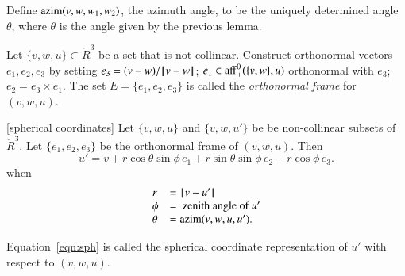 \begin{definition}[azim] 
Define ${\operatorname{azim}}(v,w,w_1,w_2)$, the azimuth angle, 
to be the uniquely determined
angle $\theta$, where $\theta$ is the angle given by the previous
lemma.
\end{definition}

\begin{definition}[frame]
Let $\{v,w,u\}\subset\ring{R}^3$ be a set that is not collinear.
Construct orthonormal vectors  $e_1,e_2,e_3$ by setting
$e_3 = (v-w)/{\hskip0.1em|\hskip-0.15em|\hskip0.1em}v - w{\hskip0.1em|\hskip-0.15em|\hskip0.1em}$; 
$e_1\in{\operatorname{aff}}_+^0(\{v,w\},u)$ orthonormal with $e_3$;
$e_2 = e_3\times e_1$.
 The set $E=\{e_1,e_2,e_3\}$ is called
the {\it orthonormal frame} for $(v,w,u)$.
\end{definition}

\begin{lemma}[spherical coordinates]\label{lemma:sph}
Let $\{v,w,u\}$ and $\{v,w,u'\}$ be be non-collinear subsets of $\ring{R}^3$.
Let $\{e_1,e_2,e_3\}$ be the orthonormal frame of $(v,w,u)$.
  Then
   \begin{equation}
   u' = v + r \cos\theta \sin\phi\, e_1 + r \sin\theta\sin\phi\, e_2 +
   r\cos\phi\,e_3.
   \label{eqn:sph}
   \end{equation}
when 
$$
\begin{array}{lll}
r &= {\hskip0.1em|\hskip-0.15em|\hskip0.1em}v  -  u'{\hskip0.1em|\hskip-0.15em|\hskip0.1em}\\
\phi &= \text{ zenith angle of } u'\\
\theta &={\operatorname{azim}}(v,w,u,u').
\end{array}
$$
\end{lemma}

\begin{definition}\label{def:sph}
Equation~\ref{eqn:sph} is called the spherical coordinate representation of
$u'$ with respect to $(v,w,u)$.   
\end{definition}

